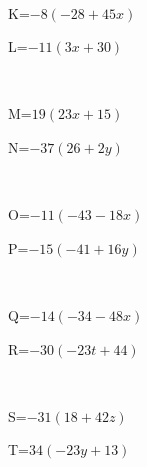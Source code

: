 \documentclass{article}%
\begin{document}
\\%
\begin{minipage}{0.5\textwidth}%
K=$-8(-28+45x)$\\%
\end{minipage}%
\begin{minipage}{0.5\textwidth}%
L=$-11(3x+30)$\\%
\end{minipage}%
\\%
\begin{minipage}{0.5\textwidth}%
M=$19(23x+15)$\\%
\end{minipage}%
\begin{minipage}{0.5\textwidth}%
N=$-37(26+2y)$\\%
\end{minipage}%
\\%
\begin{minipage}{0.5\textwidth}%
O=$-11(-43-18x)$\\%
\end{minipage}%
\begin{minipage}{0.5\textwidth}%
P=$-15(-41+16y)$\\%
\end{minipage}%
\\%
\begin{minipage}{0.5\textwidth}%
Q=$-14(-34-48x)$\\%
\end{minipage}%
\begin{minipage}{0.5\textwidth}%
R=$-30(-23t+44)$\\%
\end{minipage}%
\\%
\begin{minipage}{0.5\textwidth}%
S=$-31(18+42z)$\\%
\end{minipage}%
\begin{minipage}{0.5\textwidth}%
T=$34(-23y+13)$\\%
\end{minipage}%
\\

%
\newpage%
\end{document}
